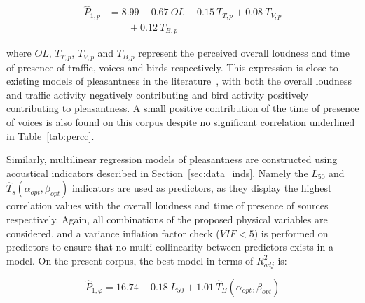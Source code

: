 \documentclass[twocolumn]{article}
\begin{document}
\begin{equation}
\begin{split}
\hat P_{1, p} & = 8.99 - 0.67~OL - 0.15~T_{T, p} + 0.08~T_{V, p}\\
&\qquad + 0.12~T_{B, p} \label{eq:pp1}
\end{split}
\end{equation}

where $OL$, $T_{T, p}$, $T_{V, p}$ and $T_{B, p}$ represent the perceived overall loudness and time of presence of traffic, voices and birds respectively. This expression is close to existing models of pleasantness in the literature~\cite{ricciardi2014, aumond2017}, with both the overall loudness and traffic activity negatively contributing and bird activity positively contributing to pleasantness. A small positive contribution of the time of presence of voices is also found on this corpus despite no significant correlation underlined in Table~\ref{tab:percc}.

Similarly, multilinear regression models of pleasantness are constructed using acoustical indicators described in Section~\ref{sec:data_inds}. Namely the $L_{50}$ and $\hat T_s(\alpha_{opt}, \beta_{opt})$ indicators are used as predictors, as they display the highest correlation values with the overall loudness and time of presence of sources respectively. Again, all combinations of the proposed physical variables are considered, and a variance inflation factor check ($VIF<5$) is performed on predictors to ensure that no multi-collinearity between predictors exists in a model. On the present corpus, the best model in terms of $R^2_{adj}$ is:

\begin{equation}
\hat P_{1, \varphi} = 16.74 - 0.18~L_{50} + 1.01~\hat T_B(\alpha_{opt}, \beta_{opt}) \label{eq:pphi}
\end{equation}
\end{document}
